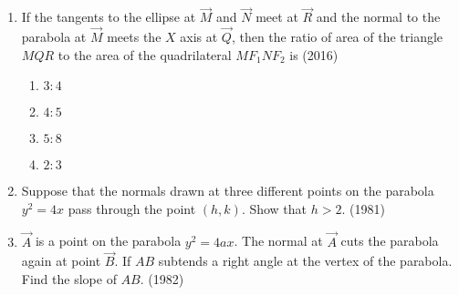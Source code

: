 \begin{enumerate}
\begin{enumerate}
\item Length of the chord $PQ$ is
\hfill(2013)        
\begin{multicols}{4}
\begin{enumerate}
    \item $7a$
    \item $5a$
    \item $2a$
    \item $3a$
\end{enumerate}
\end{multicols}
\item If $st=1$, then the tangent at $\Vec{P}$ and the normal at $\Vec{M}$ to the
parabola meet at a point whose ordinate is 
\begin{multicols}{4}
\begin{enumerate}
    \item $\frac{a(t^2+1)^2}{t^3}$
    \item $\frac{a(t^2+1)}{2t^3}$
    \item $\frac{1}{t}$
    \item $\frac{t^2-1}{t}$
    \end{enumerate}
\end{multicols}
	\end{enumerate}
\item If the tangents to the ellipse at $\Vec{M}$ and $\Vec{N}$ meet at $\Vec{R}$ and the normal to the parabola at $\Vec{M}$ meets the $X$ axis at $\Vec{Q}$, then the ratio of area of the triangle $MQR$ to the area of the quadrilateral $MF_1NF_2$ is
\hfill(2016)
\begin{multicols}{4}
\begin{enumerate}
    \item $3:4$
    \item $4:5$
    \item $5:8$
    \item $2:3$
\end{enumerate}
\end{multicols}
    \item Suppose that the normals drawn at three different points on the parabola $y^2=4x$ pass through the point $(h,k)$. Show that $h>2$. 
		\hfill(1981)
		
	\item $\vec{A}$ is a point on the parabola $y^2=4ax$. The normal at $\vec{A}$ cuts the parabola again at point $\vec{B}$. If $AB$ subtends a right angle at the vertex of the parabola. Find the slope of $AB$.  
		\hfill(1982)
		

\end{enumerate}
